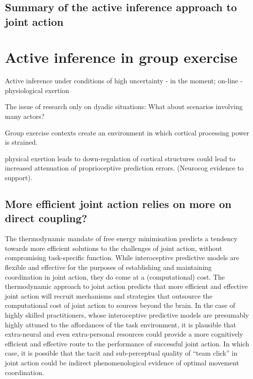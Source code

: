 \begin{CJK}{UTF8}{gbsn}
\subsection{Summary of the active inference approach to joint action}






\section{Active inference in group exercise \label{sect:activeInfGE}}



Active inference under conditions of high uncertainty
- in the moment; on-line
- physiological exertion

The issue of research only on dyadic situations:
  What about scenarios involving many actors?

  Group exercise contexts create an environment in which cortical processing power is strained.

physical exertion leads to down-regulation of cortical structures could lead to increased attenuation of proprioceptive prediction errors. (Neurocog evidence to support).



\subsection{More efficient joint action relies on more on direct coupling?}

The thermodynamic mandate of free energy minimisation predicts a tendency towards more efficient solutions to the challenges of joint action, without compromising task-specific function.  While interoceptive predictive models are flexible and effective for the purposes of establishing and maintaining coordination in joint action, they do come at a (computational) cost.  The thermodynamic approach to joint action predicts that more efficient and effective joint action will recruit mechanisms and strategies that outsource the computational cost of joint action to sources beyond the brain. In the case of highly skilled practitioners, whose interoceptive predictive models are presumably highly attuned to the affordances of the task environment, it is plausible that extra-neural and even extra-personal resources could provide a more cognitively efficient and effective route to the performance of successful joint action.  In which case, it is possible that the tacit and sub-perceptual quality of ``team click'' in joint action could be indirect phenomenological evidence of optimal movement coordination.


\end{CJK}
